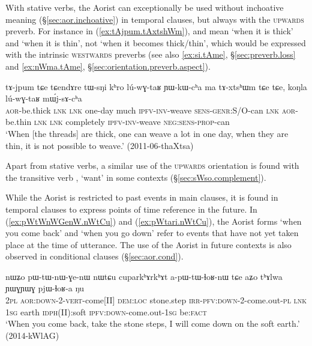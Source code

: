 With stative verbs, the Aorist can exceptionally be used without inchoative meaning (§\ref{sec:aor.inchoative}) in temporal clauses, but always with the \textsc{upwards}  preverb. For instance in (\ref{ex:tAjpum.tAxtshWm}),  and  mean `when it is thick' and `when it is thin', not `when it becomes thick/thin', which would be expressed with the intrinsic \textsc{westwards} preverbs (see also \ref{ex:si.tAme}, §\ref{sec:preverb.loss} and \ref{ex:nWma.tAme}, §\ref{sec:orientation.preverb.aspect}). 

\begin{exe}
\ex \label{ex:tAjpum.tAxtshWm}
 \gll tɤ-jpum tɕe tɕendɤre tɯ-sŋi kʰro lú-wɣ-taʁ ɲɯ-kɯ-cʰa ma tɤ-xtsʰɯm tɕe tɕe, koŋla lú-wɣ-taʁ mɯ́j-sɤ-cʰa   \\
 \textsc{aor}-be.thick \textsc{lnk} \textsc{lnk} one-day much \textsc{ipfv}-\textsc{inv}-weave \textsc{sens}-\textsc{genr}:S/O-can \textsc{lnk} \textsc{aor}-be.thin \textsc{lnk} \textsc{lnk} completely \textsc{ipfv}-\textsc{inv}-weave \textsc{neg}:\textsc{sens}-\textsc{prop}-can \\
\glt `When [the threads] are thick, one can weave a lot in one day, when they are thin, it is not possible to weave.' (2011-06-thaXtsa)
\end{exe}

Apart from stative verbs, a similar use of the \textsc{upwards} orientation is found with the transitive verb , `want' in some contexts (§\ref{sec:sWso.complement}).

While the Aorist is restricted to past events in main clauses, it is found in temporal clauses to express points of time reference in the future. In (\ref{ex:pWtWnWGenW.nWtCu}) and (\ref{ex:pWtari.nWtCu}), the Aorist forms   `when you come back' and  `when you go down' refer to events that have not yet taken place at the time of utterance. The use of the Aorist in future contexts is also observed in conditional clauses (§\ref{sec:aor.cond}).

\begin{exe}
\ex \label{ex:pWtWnWGenW.nWtCu}
 \gll nɯʑo pɯ-tɯ-nɯ-ɣe-nɯ nɯtɕu cuparkʰɤrkʰɤt a-pɯ-tɯ-ɬoʁ-nɯ tɕe aʑo tʰɤlwa ɲɯɣɲɯɣ pjɯ-ɬoʁ-a ŋu \\
 \textsc{2pl} \textsc{aor}:\textsc{down}-2-\textsc{vert}-come[II] \textsc{dem}:\textsc{loc} stone.step \textsc{irr}-\textsc{pfv}:\textsc{down}-2-come.out-\textsc{pl} \textsc{lnk} \textsc{1sg} earth \textsc{idph}(II):soft \textsc{ipfv}:\textsc{down}-come.out-\textsc{1sg} be:\textsc{fact} \\
\glt `When you come back, take the stone steps, I will come down on the soft earth.' (2014-kWlAG)
\end{exe}

